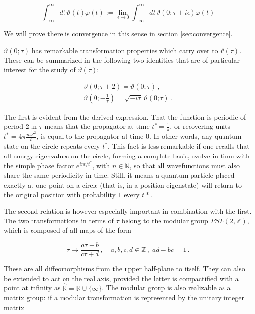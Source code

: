 \documentclass{article}
\newcommand{\T}{\ensuremath{\vartheta}}
\newcommand{\intR}{\int_{-\infty}^\infty}
\begin{document}
\begin{equation}
    \intR dt \, \T(t) \varphi(t)  := \lim_{\epsilon\rightarrow 0} \intR dt \, \vartheta(0; \tau + i \epsilon) \varphi(t)
\end{equation}

We will prove there is convergence in this sense in section \ref{sec:convergence}.

$\vartheta(0;\tau)$ has remarkable transformation properties which carry over to $\T(\tau)$. These can be summarized in the following two identities that are of particular interest for the study of $\T(\tau)$:

\begin{align}
    \vartheta(0; \tau + 2) = \vartheta(0; \tau)\,, \label{t2map}\\
    \vartheta(0; -\tfrac{1}{\tau}) = \sqrt{-i\tau} \, \vartheta(0; \tau)\,. \label{smap}
\end{align}

The first is evident from the derived expression. That the function is periodic of period $2$ in $\tau$ means that the propagator at time $t^* = \frac{1}{\pi}$, or recovering units $t^* = 4\pi \frac{mR^2}{\hbar}$, is equal to the propagator at time $0$. In other words, any quantum state on the circle repeats every $t^*$. This fact is less remarkable if one recalls that all energy eigenvalues on the circle, forming a complete basis, evolve in time with the simple phase factor $e^{int/t^*}$, with $n\in \mathbb{N}$, so that all wavefunctions must also share the same periodicity in time. Still, it means a quantum particle placed exactly at one point on a circle (that is, in a position eigenstate) will return to the original position with probability $1$ every $t*$.

\newcommand{\modg}{PSL(2,\mathbb{Z})}

The second relation is however especially important in combination with the first. The two transformations in terms of $\tau$ belong to the modular group $\modg$, which is composed of all maps of the form

\begin{equation}
    \tau \rightarrow \frac{a \tau + b}{c\tau + d}\,, \quad a,b,c,d \in \mathbb{Z}\,,\; ad - bc = 1\,.
\end{equation}

These are all diffeomorphisms from the upper half-plane to itself. They can also be extended to act on the real axis, provided the latter is compactified with a point at infinity as $\hat{\mathbb{R}} = \mathbb{R} \cup \{\infty\}$. The modular group is also realizable as a matrix group: if a modular transformation is represented by the unitary integer matrix
\end{document}
